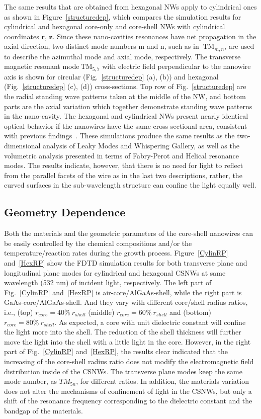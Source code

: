 The same results that are obtained from hexagonal NWs apply to cylindrical ones
as shown in Figure~\ref{structuredep}, which compares the simulation results
for cylindrical and hexagonal core-only and core-shell NWs with cylindrical
coordinates \(\mathbf{r}\), \(\mathbf{z}\). Since these nano-cavities
resonances have net propagation in the axial direction, two distinct mode
numbers m and n, such as in \(\ \text{TM}_{m,n}\), are used to describe the
azimuthal mode and axial mode, respectively. The transverse magnetic resonant
mode\(\ \text{TM}_{5,7}\) with electric field perpendicular to the nanowire
axis is shown for circular (Fig.~\ref{structuredep} (a), (b)) and hexagonal
(Fig.~\ref{structuredep} (c), (d)) cross-sections. Top row of
Fig.~\ref{structuredep} are the radial standing wave patterns taken at the
middle of the NW, and bottom parts are the axial variation which together
demonstrate standing wave patterns in the nano-cavity. The hexagonal and
cylindrical NWs present nearly identical optical behavior if the nanowires have
the same cross-sectional area, consistent with previous
findings~\cite{Henneghien:2009te}. These simulations produce the same results
as the two-dimensional analysis of Leaky Modes and Whispering Gallery, as well
as the volumetric analysis presented in terms of Fabry-Perot and Helical
resonance modes. The results indicate, however, that there is no need for light
to reflect from the parallel facets of the wire as in the last two
descriptions, rather, the curved surfaces in the sub-wavelength structure can
confine the light equally well.

\subsection{Geometry Dependence}

Both the materials and the geometric parameters of the core-shell nanowires can
be easily controlled by the chemical compositions and/or the
temperature/reaction rates during the growth process. Figure~\ref{CylinRP}
and~\ref{HexRP} show the FDTD simulation results for both transverse plane and
longitudinal plane modes for cylindrical and hexagonal CSNWs at same wavelength
(532 nm) of incident light, respectively. The left part of Fig.~\ref{CylinRP}
and~\ref{HexRP} is air-core/AlGaAs-shell, while the right part is
GaAs-core/AlGaAs-shell. And they vary with different core/shell radius ratios,
i.e., (top) $r_{core} = 40\%\ r_{shell}$ (middle) $r_{core} = 60\%\ r_{shell}$
and (bottom) $r_{core} = 80\%\ r_{shell}$. As expected, a core with unit
dielectric constant will confine the light more into the shell. The reduction
of the shell thickness will further move the light into the shell with a little
light in the core. However, in the right part of Fig.~\ref{CylinRP}
and~\ref{HexRP}, the results clear indicated that the increasing of the
core-shell radius ratio does not modify the electromagnetic field distribution
inside of the CSNWs. The transverse plane modes keep the same mode number, as
${TM}_{5n}$, for different ratios. In addition, the materials variation does
not alter the mechanisms of confinement of light in the CSNWs, but only a shift
of the resonance frequency corresponding to the dielectric constant and the
bandgap of the materials.

